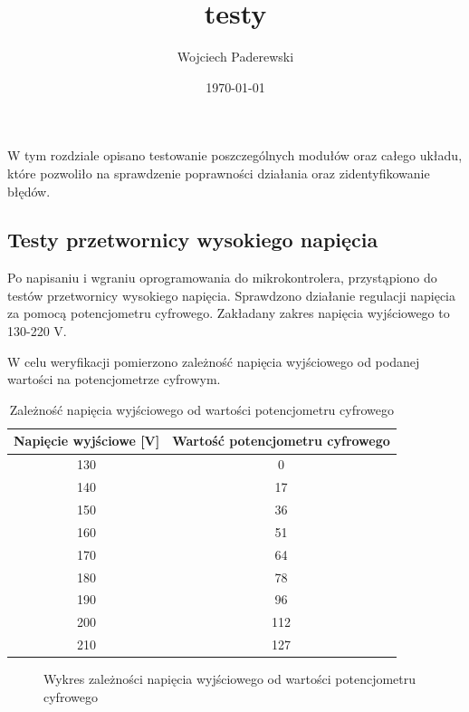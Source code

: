 \documentclass[../main.tex]{subfiles}
\author{Wojciech Paderewski}
\date{\today}
\title{testy}
\begin{document}
W tym rozdziale opisano testowanie poszczególnych 
modułów oraz całego układu, które pozwoliło na sprawdzenie poprawności działania oraz zidentyfikowanie błędów.

\subsection{Testy przetwornicy wysokiego napięcia}
Po napisaniu i wgraniu oprogramowania do mikrokontrolera, przystąpiono do testów przetwornicy wysokiego napięcia.
Sprawdzono działanie regulacji napięcia za pomocą potencjometru cyfrowego. Zakładany zakres napięcia wyjściowego to 130-220 V.

W celu weryfikacji pomierzono zależność napięcia wyjściowego od podanej wartości na potencjometrze cyfrowym.

\begin{table}[H]
    \centering
    \begin{tabular}{|c|c|}
        \hline
        Napięcie wyjściowe [V] & Wartość potencjometru cyfrowego \\
        \hline
        130 & 0 \\
        140 & 17 \\
        150 & 36 \\
        160 & 51 \\
        170 & 64 \\
        180 & 78 \\
        190 & 96 \\
        200 & 112 \\
        210 & 127 \\
        \hline
    \end{tabular}
    \caption{Zależność napięcia wyjściowego od wartości potencjometru cyfrowego}
\end{table}

\begin{figure}[H]
  \centering
  \caption{Wykres zależności napięcia wyjściowego od wartości potencjometru cyfrowego}
\end{figure}
\end{document}
